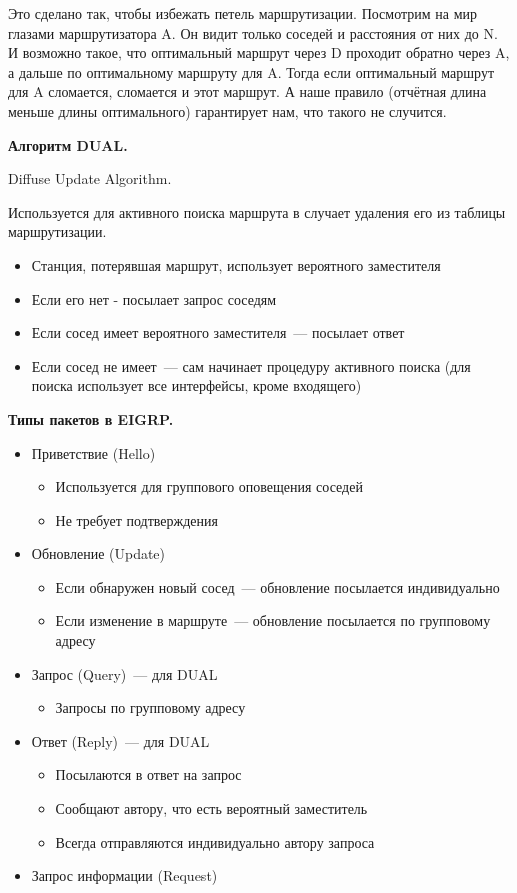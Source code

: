Это сделано так, чтобы избежать петель маршрутизации. Посмотрим на мир глазами маршрутизатора A. Он видит только соседей и расстояния от них до N. И возможно такое, что оптимальный маршрут через D проходит обратно через A, а дальше по оптимальному маршруту для A. Тогда если оптимальный маршрут для A сломается, сломается и этот маршрут. А наше правило (отчётная длина меньше длины оптимального) гарантирует нам, что такого не случится. 

{\bf Алгоритм DUAL.}

Diffuse Update Algorithm.

Используется для активного поиска маршрута в случает удаления его из таблицы маршрутизации.

\begin{itemize}
    \item Станция, потерявшая маршрут, использует вероятного заместителя
    \item Если его нет - посылает запрос соседям
    \item Если сосед имеет вероятного заместителя~--- посылает ответ
    \item Если сосед не имеет~--- сам начинает процедуру активного поиска (для поиска использует все интерфейсы, кроме входящего)
\end{itemize}

{\bf Типы пакетов в EIGRP.}

\begin{itemize}
    \item Приветствие (Hello)
    \begin{itemize}
        \item Используется для группового оповещения соседей
        \item Не требует подтверждения
    \end{itemize}
    \item Обновление (Update)
    \begin{itemize}
        \item Если обнаружен новый сосед~--- обновление посылается индивидуально
        \item Если изменение в маршруте~--- обновление посылается по групповому адресу
    \end{itemize}
    \item Запрос (Query)~--- для DUAL
    \begin{itemize}
        \item Запросы по групповому адресу
    \end{itemize}
    \item Ответ (Reply)~--- для DUAL
    \begin{itemize}
        \item Посылаются в ответ на запрос
        \item Сообщают автору, что есть вероятный заместитель
        \item Всегда отправляются индивидуально автору запроса
    \end{itemize}
    \item Запрос информации (Request)
\end{itemize}

